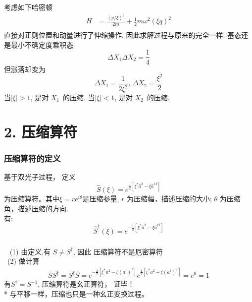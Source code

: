 \begin{frame}
 \frametitle{}  
 {\Bullet}考虑如下哈密顿 
 \[\begin{aligned}
     H &= \frac{(p/\xi)^2}{2m} +\frac{1}{2}m \omega^2 (\xi q)^2  \\ 
 \end{aligned} \]    
 直接对正则位置和动量进行了伸缩操作, 因此求解过程与原来的完全一样. 基态还是最小不确定度乘积态
 \[ \Delta X_1 \Delta X_2 =\dfrac{1}{4}\] 
 但涨落却变为 
 \[ \Delta X_1  = \frac{1}{2 \xi^2}, \, \Delta X_2  = \frac{\xi^2}{2}\]  
 当$\left|\xi\right|>1$, 是对 $X_1 $ 的压缩. 当$\left|\xi\right|<1$, 是对 $X_2 $ 的压缩. 
\end{frame}

\section{2. 压缩算符}

\begin{frame}
 \frametitle{压缩算符的定义}
 \begin{center}
    \begin{tcolorbox2}[0.86]{}
    基于双光子过程， 定义
    \[ \hat{S}(\xi) = e^{\frac{1}{2}[\xi^* \hat{a}^2 - \xi \hat{a}^{\dagger 2}]}\]
    为压缩算符。其中$\xi= r e^{i\theta}$是压缩参量, $r$ 为压缩幅，描述压缩的大小; $\theta$ 为压缩角，描述压缩的方向. \\
    有:  
    \[ \hat{S}^\dagger(\xi) = e^{-\frac{1}{2}[\xi^* \hat{a}^2 - \xi \hat{a}^{\dagger 2}]}\]
   \end{tcolorbox2}  
\end{center}    
\end{frame}

\begin{frame}
 \frametitle{}
    \证 ~ (1) 由定义,有 $S \not = S^\dagger$, 因此 压缩算符不是厄密算符 \\ 
    ~{\hspace*{2.5em}}(2) 做计算
    \[\begin{aligned}
        S S^\dagger = S^\dagger S = e^{-\frac{1}{2}[\xi^* a^2 - \xi (a^{\dagger}) ^2]} e^{\frac{1}{2}[\xi^* a^2 - \xi (a^{\dagger}) ^2]} =e^0 =1
    \end{aligned} \]
     有$S^\dagger = S^{-1} $,  压缩算符是幺正算符， 证毕！ \\ {\vspace*{1.3em}}
     * 与平移一样，压缩也只是一种幺正变换过程。
\end{frame}


